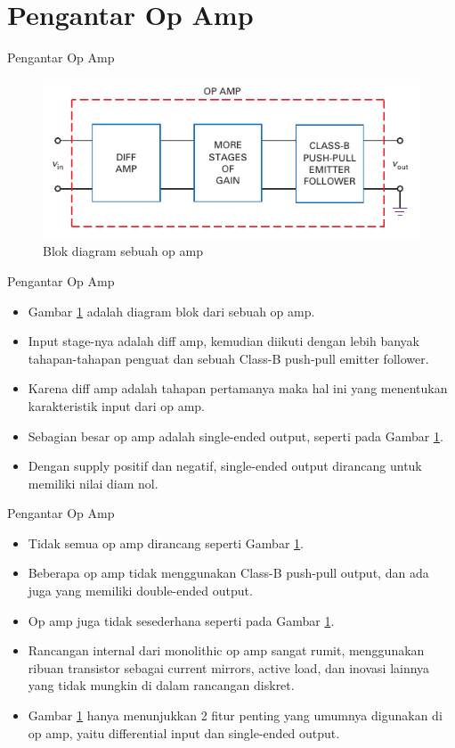\section{Pengantar Op Amp}

\begin{frame}{Pengantar Op Amp}
\begin{figure}
	\centering
	\includegraphics[width=0.8\linewidth]{gambar/fig-16.01}
	\caption{Blok diagram sebuah op amp}
	\label{fig-16.01}
\end{figure}
\end{frame}

\begin{frame}{Pengantar Op Amp}
	\begin{itemize}
		\item Gambar \ref{fig-16.01} adalah diagram blok dari sebuah op amp.
		\item Input stage-nya adalah diff amp, kemudian diikuti dengan lebih banyak tahapan-tahapan penguat dan sebuah Class-B push-pull emitter follower.
		\item Karena diff amp adalah tahapan pertamanya maka hal ini yang menentukan karakteristik input dari op amp.
		\item Sebagian besar op amp adalah single-ended output, seperti pada Gambar \ref{fig-16.01}.
		\item Dengan supply positif dan negatif, single-ended output dirancang untuk memiliki nilai diam nol.
	\end{itemize}
\end{frame}

\begin{frame}{Pengantar Op Amp}
	\begin{itemize}
		\item Tidak semua op amp dirancang seperti Gambar \ref{fig-16.01}.
		\item Beberapa op amp tidak menggunakan Class-B push-pull output, dan ada juga yang memiliki double-ended output.
		\item Op amp juga tidak sesederhana seperti pada Gambar \ref{fig-16.01}.
		\item Rancangan internal dari monolithic op amp sangat rumit, menggunakan ribuan transistor sebagai current mirrors, active load, dan inovasi lainnya yang tidak mungkin di dalam rancangan diskret.
		\item Gambar \ref{fig-16.01} hanya menunjukkan 2 fitur penting yang umumnya digunakan di op amp, yaitu differential input dan single-ended output.
	\end{itemize}
\end{frame}

